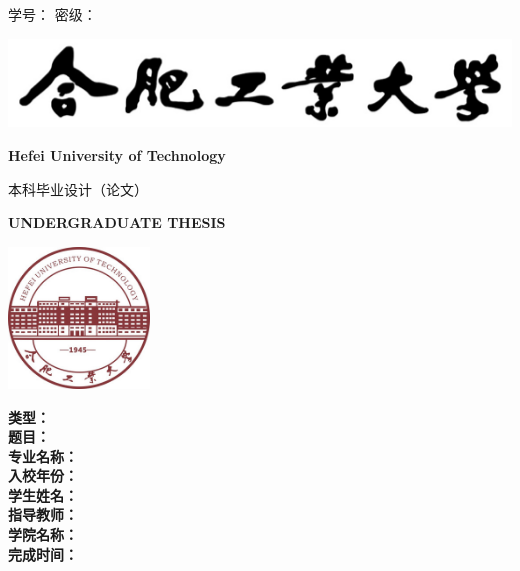 \begin{titlepage}
{\heiti 学\hspace{1.5em}号：\underlineFixlen[3.5cm]{\studentID} \hfill
	{\heiti 密\hspace{1.5em}级：\underlineFixlen[3.5cm]{\privacy}}}

\centering
{\vspace{1.7cm} \includegraphics{images/hfut_name.png}\vspace{0.3cm}}

{\LARGE \bfseries Hefei University of Technology}\vspace{1cm}

{\chuhao \heiti 本科毕业设计（论文）}\vspace{0.7cm}

{\LARGE \bfseries UNDERGRADUATE THESIS}\vspace{0.9cm}

{\includegraphics[width=3.76cm, height=3.76cm]{images/hfut_logo.jpg}\vspace{1.3cm}}


{
\linespread{1.6}
\songti \sanhao
	{\bfseries 类\hspace{2em}型：}\underlineFixlen[8.8cm]{\type}\\ %
	{\bfseries 题\hspace{2em}目：}\underlineFixlen[8.8cm]{\titleCn}\\
	{\bfseries 专业名称：}\underlineFixlen[8.8cm]{\major}\\
	{\bfseries 入校年份：}\underlineFixlen[8.8cm]{\enrolmentYear}\\
	{\bfseries 学生姓名：}\underlineFixlen[8.8cm]{\studentNameCn}\\
	{\bfseries 指导教师：}\underlineFixlen[8.8cm]{\supervisor}\\
	{\bfseries 学院名称：}\underlineFixlen[8.8cm]{\department}\\
	{\bfseries 完成时间：}\\
}


\end{titlepage}
